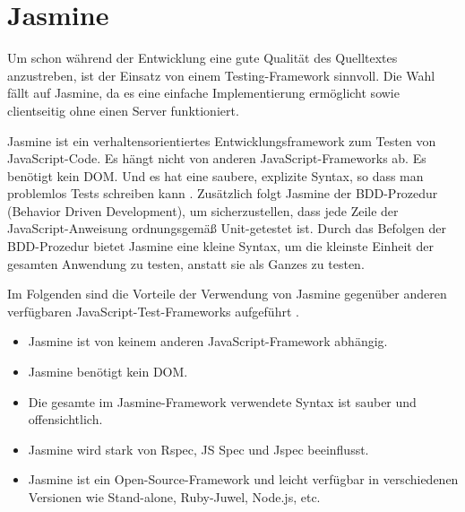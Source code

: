 \section{Jasmine}
Um schon während der Entwicklung eine gute Qualität des Quelltextes anzustreben, ist der Einsatz von einem Testing-Framework sinnvoll. Die Wahl fällt auf Jasmine, da es eine einfache Implementierung ermöglicht sowie clientseitig ohne einen Server funktioniert. 

Jasmine ist ein verhaltensorientiertes Entwicklungsframework zum Testen von JavaScript-Code. Es hängt nicht von anderen JavaScript-Frameworks ab. Es benötigt kein DOM. Und es hat eine saubere, explizite Syntax, so dass man problemlos Tests schreiben kann \cite{jasmine}. Zusätzlich folgt Jasmine der BDD-Prozedur (Behavior Driven Development), um sicherzustellen, dass jede Zeile der JavaScript-Anweisung ordnungsgemäß Unit-getestet ist. Durch das Befolgen der BDD-Prozedur bietet Jasmine eine kleine Syntax, um die kleinste Einheit der gesamten Anwendung zu testen, anstatt sie als Ganzes zu testen.  

Im Folgenden sind die Vorteile der Verwendung von Jasmine gegenüber anderen verfügbaren JavaScript-Test-Frameworks aufgeführt \cite{jasmineTutorial}.
\begin{itemize}
\item	Jasmine ist von keinem anderen JavaScript-Framework abhängig.
\item	Jasmine benötigt kein DOM.
\item	Die gesamte im Jasmine-Framework verwendete Syntax ist sauber und offensichtlich.
\item	Jasmine wird stark von Rspec, JS Spec und Jspec beeinflusst.
\item	Jasmine ist ein Open-Source-Framework und leicht verfügbar in verschiedenen Versionen wie Stand-alone, Ruby-Juwel, Node.js, etc.
\end{itemize}



